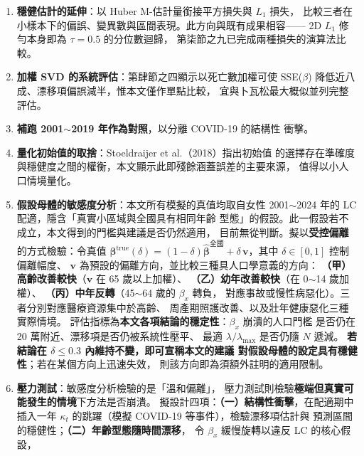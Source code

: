 \documentclass[UTF8, fontset=macnew, a4paper, 12pt]{ctexart}
\begin{document}
\begin{enumerate}[leftmargin=*]
  \item \textbf{穩健估計的延伸}：以 Huber M-估計量銜接平方損失與 $L_1$ 損失，
        比較三者在小樣本下的偏誤、變異數與區間表現。此方向與既有成果相容——
        2D $L_1$ 修勻本身即為 $\tau=0.5$ 的分位數迴歸，
        第柒節之九已完成兩種損失的演算法比較。
  \item \textbf{加權 SVD 的系統評估}：第肆節之四顯示以死亡數加權可使
        SSE($\beta$) 降低近八成、漂移項偏誤減半，惟本文僅作單點比較，
        宜與卜瓦松最大概似並列完整評估。
  \item \textbf{補跑 2001$\sim$2019 年作為對照}，以分離 COVID-19 的結構性
        衝擊。
  \item \textbf{量化初始值的取捨}：Stoeldraijer et al.（2018）指出初始值
        的選擇存在準確度與穩健度之間的權衡，本文顯示此即殘餘涵蓋誤差的主要來源，
        值得以小人口情境量化。
  \item \textbf{假設母體的敏感度分析}：本文所有模擬的真值均取自女性
        2001$\sim$2024 年的 LC 配適，隱含「真實小區域與全國具有相同年齡
        型態」的假設。此一假設若不成立，本文得到的門檻與建議是否仍然適用，
        目前無從判斷。擬以\textbf{受控偏離}的方式檢驗：令真值
        $\boldsymbol{\beta}^{\text{true}}(\delta)
        =(1-\delta)\hat{\boldsymbol{\beta}}^{\text{全國}}
        +\delta\,\mathbf{v}$，其中 $\delta\in[0,1]$ 控制偏離幅度、
        $\mathbf{v}$ 為預設的偏離方向，並比較三種具人口學意義的方向：
        \textbf{（甲）高齡改善較快}（$\mathbf{v}$ 在 65 歲以上加權）、
        \textbf{（乙）幼年改善較快}（在 0$\sim$14 歲加權）、
        \textbf{（丙）中年反轉}（45$\sim$64 歲的 $\beta_x$ 轉負，
        對應事故或慢性病惡化）。三者分別對應醫療資源集中於高齡、
        周產期照護改善、以及壯年健康惡化三種實際情境。
        評估指標為\textbf{本文各項結論的穩定性}：$\beta_x$ 崩潰的人口門檻
        是否仍在 20 萬附近、漂移項是否仍被系統性壓平、
        最適 $\lambda/\lambda_{\max}$ 是否仍隨 $N$ 遞減。
        \textbf{若結論在 $\delta\le0.3$ 內維持不變，即可宣稱本文的建議
        對假設母體的設定具有穩健性}；若在某個方向上迅速失效，
        則該方向即為須額外註明的適用限制。
  \item \textbf{壓力測試}：敏感度分析檢驗的是「溫和偏離」，
        壓力測試則檢驗\textbf{極端但真實可能發生的情境}下方法是否崩潰。
        擬設計四項：\textbf{（一）結構性衝擊}，在配適期中插入一年
        $\kappa_t$ 的跳躍（模擬 COVID-19 等事件），檢驗漂移項估計與
        預測區間的穩健性；\textbf{（二）年齡型態隨時間漂移}，
        令 $\beta_x$ 緩慢旋轉以違反 LC 的核心假設，

\end{enumerate}
\end{document}

